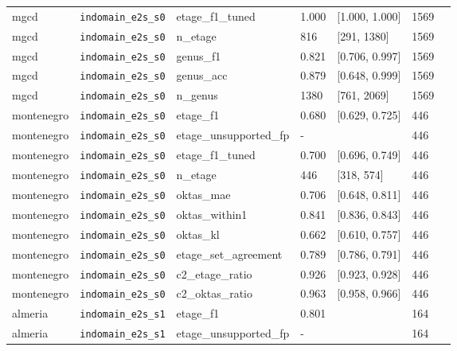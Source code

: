 \begin{center}
{\begin{tabular}{lllllll}
mgcd & \texttt{indomain\_\allowbreak{}e2s\_\allowbreak{}s0} & etage\_f1\_tuned & 1.000 & [1.000, 1.000] & 1569 &  \\
mgcd & \texttt{indomain\_\allowbreak{}e2s\_\allowbreak{}s0} & n\_etage & 816 & [291, 1380] & 1569 &  \\
mgcd & \texttt{indomain\_\allowbreak{}e2s\_\allowbreak{}s0} & genus\_f1 & 0.821 & [0.706, 0.997] & 1569 &  \\
mgcd & \texttt{indomain\_\allowbreak{}e2s\_\allowbreak{}s0} & genus\_acc & 0.879 & [0.648, 0.999] & 1569 &  \\
mgcd & \texttt{indomain\_\allowbreak{}e2s\_\allowbreak{}s0} & n\_genus & 1380 & [761, 2069] & 1569 &  \\
montenegro & \texttt{indomain\_\allowbreak{}e2s\_\allowbreak{}s0} & etage\_f1 & 0.680 & [0.629, 0.725] & 446 &  \\
montenegro & \texttt{indomain\_\allowbreak{}e2s\_\allowbreak{}s0} & etage\_unsupported\_fp & - &  & 446 &  \\
montenegro & \texttt{indomain\_\allowbreak{}e2s\_\allowbreak{}s0} & etage\_f1\_tuned & 0.700 & [0.696, 0.749] & 446 &  \\
montenegro & \texttt{indomain\_\allowbreak{}e2s\_\allowbreak{}s0} & n\_etage & 446 & [318, 574] & 446 &  \\
montenegro & \texttt{indomain\_\allowbreak{}e2s\_\allowbreak{}s0} & oktas\_mae & 0.706 & [0.648, 0.811] & 446 &  \\
montenegro & \texttt{indomain\_\allowbreak{}e2s\_\allowbreak{}s0} & oktas\_within1 & 0.841 & [0.836, 0.843] & 446 &  \\
montenegro & \texttt{indomain\_\allowbreak{}e2s\_\allowbreak{}s0} & oktas\_kl & 0.662 & [0.610, 0.757] & 446 &  \\
montenegro & \texttt{indomain\_\allowbreak{}e2s\_\allowbreak{}s0} & etage\_set\_agreement & 0.789 & [0.786, 0.791] & 446 &  \\
montenegro & \texttt{indomain\_\allowbreak{}e2s\_\allowbreak{}s0} & c2\_etage\_ratio & 0.926 & [0.923, 0.928] & 446 &  \\
montenegro & \texttt{indomain\_\allowbreak{}e2s\_\allowbreak{}s0} & c2\_oktas\_ratio & 0.963 & [0.958, 0.966] & 446 &  \\
almeria & \texttt{indomain\_\allowbreak{}e2s\_\allowbreak{}s1} & etage\_f1 & 0.801 &  & 164 &  \\
almeria & \texttt{indomain\_\allowbreak{}e2s\_\allowbreak{}s1} & etage\_unsupported\_fp & - &  & 164 &  \\

\end{tabular}}
\end{center}
